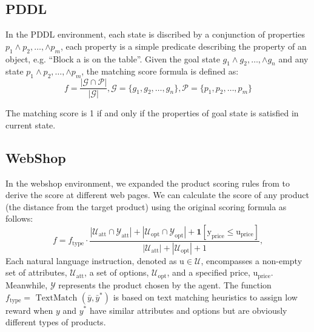 \subsection{PDDL\label{sec: Annotation of pddl}}

In the PDDL environment, each state is discribed by a conjunction of properties $p_1\land p_2, \dots, \land p_m$, each property is a simple predicate describing the property of an object, e.g. ``Block a is on the table''. Given the goal state $g_1\land g_2, \dots, \land g_n$ and any state $p_1\land p_2, \dots, \land p_m$, the matching score formula is defined as:
\begin{equation}
    f = \frac{|\mathcal{G}\cap \mathcal{P}|}{|\mathcal{G}|}, \mathcal{G}=\{g_1,g_2,\dots, g_n\}, \mathcal{P}=\{p_1,p_2,\dots, p_m\}
\end{equation}

The matching score is 1 if and only if the properties of goal state is satisfied in current state. 

\subsection{WebShop\label{sec: Re-annotation of WebShop}}
In the webshop environment, we expanded the product scoring rules from \citep{yao2022webshop} to derive the score at different web pages. We can calculate the score of any product (the distance from the target product) using the original scoring formula as follows:
\begin{equation}
\label{eq:r}
    f = f_{\text{type}} \cdot \frac{|\mathcal{U}_{\text{att}} \cap \mathcal{Y}_{\text{att}}| + |\mathcal{U}_{\text{opt}} \cap \mathcal{Y}_{\text{opt}}| + \mathbf{1}[\text{y}_{\text{price}} \le \text{u}_{\text{price}}]}{|\mathcal{U}_{\text{att}}| + |\mathcal{U}_{\text{opt}}| + 1},
\end{equation}
Each natural language instruction, denoted as $\text{u} \in \mathcal{U}$,  encompasses a non-empty set of attributes, $\mathcal{U}_{\text{att}}$, a set of options, $\mathcal{U}_{\text{opt}}$, and a specified price, $\text{u}_{\text{price}}$. Meanwhile, $\mathcal{Y}$ represents the product chosen by the agent. The function $f_{\text{type}}=\text { TextMatch }\left(\bar{y}, \bar{y}^*\right)$ is based on text matching heuristics to assign low reward when $y$ and $y^*$ have similar attributes and options but are obviously different types of products.
 
